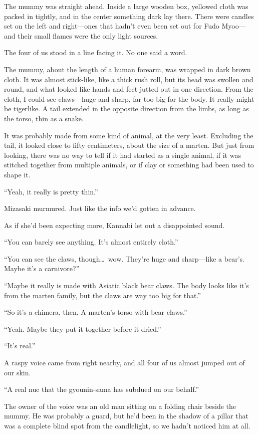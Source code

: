 \documentclass[
    a4paper,
    12pt,
    twoside,
    openany,
    UTF8,
    fontset=windows
]{ctexbook}
\begin{document}
The mummy was straight ahead. Inside a large wooden box, yellowed cloth was packed in tightly, and in the center something dark lay there. There were candles set on the left and right---ones that hadn't even been set out for Fudo Myoo---and their small flames were the only light sources.

The four of us stood in a line facing it. No one said a word.

The mummy, about the length of a human forearm, was wrapped in dark brown cloth. It was almost stick-like, like a thick rush roll, but its head was swollen and round, and what looked like hands and feet jutted out in one direction. From the cloth, I could see claws---huge and sharp, far too big for the body. It really might be tigerlike. A tail extended in the opposite direction from the limbs, as long as the torso, thin as a snake.

It was probably made from some kind of animal, at the very least. Excluding the tail, it looked close to fifty centimeters, about the size of a marten. But just from looking, there was no way to tell if it had started as a single animal, if it was stitched together from multiple animals, or if clay or something had been used to shape it.

``Yeah, it really is pretty thin.''

Mizasaki murmured. Just like the info we'd gotten in advance.

As if she'd been expecting more, Kannabi let out a disappointed sound.

``You can barely see anything. It's almost entirely cloth.''

``You can see the claws, though\dots\ wow. They're huge and sharp---like a bear's. Maybe it's a carnivore?''

``Maybe it really is made with Asiatic black bear claws. The body looks like it's from the marten family, but the claws are way too big for that.''

``So it's a chimera, then. A marten's torso with bear claws.''

``Yeah. Maybe they put it together before it dried.''

``It's real.''

A raspy voice came from right nearby, and all four of us almost jumped out of our skin.

``A real nue that the gyounin-sama has subdued on our behalf.''

The owner of the voice was an old man sitting on a folding chair beside the mummy. He was probably a guard, but he'd been in the shadow of a pillar that was a complete blind spot from the candlelight, so we hadn't noticed him at all.
\end{document}
